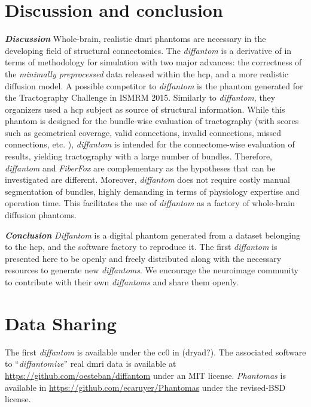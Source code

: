 \documentclass[english]{frontiers/frontiersSCNS} %
\begin{document}
\section*{Discussion and conclusion}
\noindent\textbf{\textit{Discussion\textcolon}}\label{sec:discussion} %
Whole-brain, realistic \gls*{dmri} phantoms are necessary in the developing field of structural
  connectomics.
The \emph{diffantom} is a derivative of \citep{wilkins_fiber_2014} in terms of methodology for
  simulation with two major advances: the correctness of the \emph{minimally preprocessed} data
  \citep{glasser_minimal_2013} released within the \gls*{hcp}, and a more realistic diffusion
  model.
A possible competitor to \emph{diffantom} is the phantom generated for the Tractography Challenge in
  ISMRM 2015.
Similarly to \emph{diffantom}, they organizers used a \gls*{hcp} subject as source of structural information.
While this phantom is designed for the bundle-wise evaluation of tractography (with scores such as geometrical coverage,
  valid connections, invalid connections, missed connections, etc. \citep{cote_tractometer_2013}),
  \emph{diffantom} is intended for the connectome-wise evaluation of results, yielding tractography with
  a large number of bundles.
Therefore, \emph{diffantom} and \emph{FiberFox} are complementary as the hypotheses that can be investigated are different.
Moreover, \emph{diffantom} does not require costly manual segmentation of bundles, highly demanding in terms of physiology
  expertise and operation time.
This facilitates the use of \emph{diffantom} as a factory of whole-brain diffusion phantoms.

\noindent\textbf{\textit{Conclusion\textcolon}}\label{sec:conclusion} %
\emph{Diffantom} is a digital phantom generated from a dataset belonging to the \acrlong*{hcp}, and the software factory to
  reproduce it.
The first \emph{diffantom} is presented here to be openly and freely distributed along with the necessary resources to
  generate new \emph{diffantoms}.
We encourage the neuroimage community to contribute with their own \emph{diffantoms} and share them openly.


\section*{Data Sharing}
The first \emph{diffantom} is available under the \gls*{cc0} in {\color{red} (dryad?)}.
The associated software to ``\emph{diffantomize}'' real \gls*{dmri} data is available at \url{https://github.com/oesteban/diffantom}
  under an MIT license.
\emph{Phantomas} is available in \url{https://github.com/ecaruyer/Phantomas} under the revised-BSD license.
\end{document}
